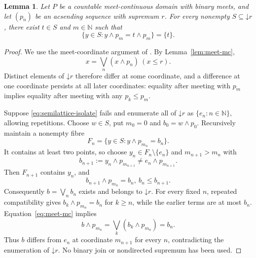 \documentclass[10pt,a4paper]{amsart}
\newtheorem{lemma}[theorem]{Lemma}
\numberwithin{equation}{section}
\newcommand{\N}{\mathbb N}
\newcommand{\down}[1]{\mathord{\downarrow}#1}
\newcommand{\mc}{\wedge}
\begin{document}
\begin{lemma}\label{lem:semilattice-isolation}
Let $P$ be a countable meet-continuous domain with binary meets, and let $(p_n)$ be an acsending sequence with supremum $r$. For every nonempty $S\subseteq\down r$, there exist $t\in S$ and $m\in\N$ such that
\begin{equation}\label{eq:semilattice-isolate}
 \{y\in S:y\mc p_m=t\mc p_m\}=\{t\}.
\end{equation}
\end{lemma}
\begin{proof}
We use the meet-coordinate argument of \cite[Lemma~3.1]{XuJi}. By Lemma~\ref{lem:meet-mc},
\[
 x=\bigvee_n(x\mc p_n)~(x\le r).
\]
Distinct elements of $\down r$ therefore differ at some coordinate, and a difference at one coordinate persists at all later coordinates: equality after meeting with $p_m$ implies equality after meeting with any $p_k\le p_m$.

Suppose \eqref{eq:semilattice-isolate} fails and enumerate all of $\down r$ as $\{e_n:n\in\N\}$, allowing repetitions. Choose $w\in S$, put $m_0=0$ and $b_0=w\mc p_0$. Recursively maintain a nonempty fibre
\[
 F_n=\{y\in S:y\mc p_{m_n}=b_n\}.
\]
It contains at least two points, so choose $y_n\in F_n\setminus\{e_n\}$ and $m_{n+1}>m_n$ with
\[
 b_{n+1}:=y_n\mc p_{m_{n+1}}\ne e_n\mc p_{m_{n+1}}.
\]
Then $F_{n+1}$ contains $y_n$, and
\[
 b_{n+1}\mc p_{m_n}=b_n,~ b_n\le b_{n+1}.
\]
Consequently $b=\bigvee_n b_n$ exists and belongs to $\down r$. For every fixed $n$, repeated compatibility gives $b_k\mc p_{m_n}=b_n$ for $k\ge n$, while the earlier terms are at most $b_n$. Equation~\eqref{eq:meet-mc} implies
\[
 b\mc p_{m_n}=\bigvee_k(b_k\mc p_{m_n})=b_n.
\]
Thus $b$ differs from $e_n$ at coordinate $m_{n+1}$ for every $n$, contradicting the enumeration of $\down r$. No binary join or nondirected supremum has been used.
\end{proof}
\end{document}
